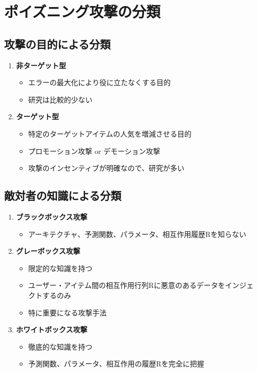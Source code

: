 \documentclass[11pt,a4paper]{article}
\begin{document}
\section{ポイズニング攻撃の分類}

\subsection{攻撃の目的による分類}
\begin{enumerate}
    \item \textbf{非ターゲット型}
    \begin{itemize}
        \item エラーの最大化により役に立たなくする目的
        \item 研究は比較的少ない
    \end{itemize}
    
    \item \textbf{ターゲット型}
    \begin{itemize}
        \item 特定のターゲットアイテムの人気を増減させる目的
        \item プロモーション攻撃 or デモーション攻撃
        \item 攻撃のインセンティブが明確なので、研究が多い
    \end{itemize}
\end{enumerate}

\subsection{敵対者の知識による分類}
\begin{enumerate}
    \item \textbf{ブラックボックス攻撃}
    \begin{itemize}
        \item アーキテクチャ、予測関数、パラメータ、相互作用履歴Rを知らない
    \end{itemize}
    
    \item \textbf{グレーボックス攻撃}
    \begin{itemize}
        \item 限定的な知識を持つ
        \item ユーザー・アイテム間の相互作用行列Rに悪意のあるデータをインジェクトするのみ
        \item 特に重要になる攻撃手法
    \end{itemize}
    
    \item \textbf{ホワイトボックス攻撃}
    \begin{itemize}
        \item 徹底的な知識を持つ
        \item 予測関数、パラメータ、相互作用の履歴Rを完全に把握
    \end{itemize}
\end{enumerate}
\end{document}
